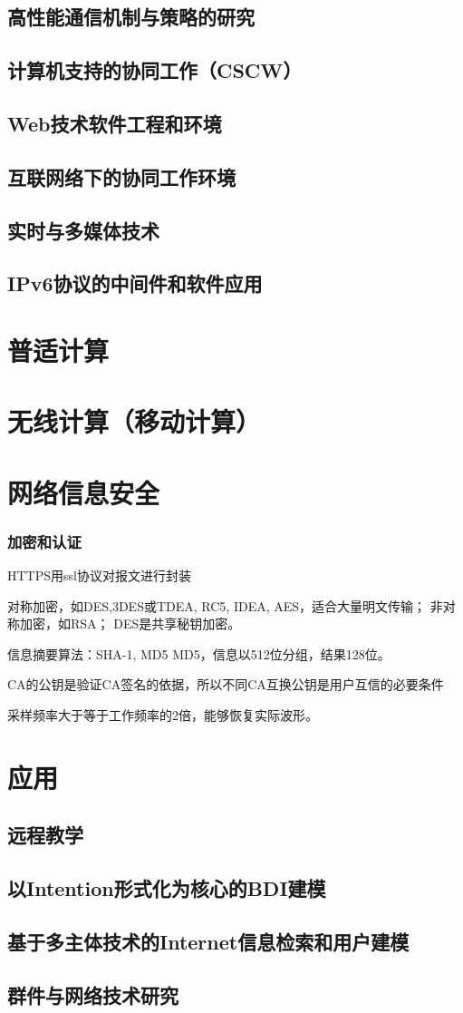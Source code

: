 \documentclass[UTF8]{../computerUniverse}
\begin{document}
\section{高性能通信机制与策略的研究}
\section{计算机支持的协同工作（CSCW）}
\section{Web技术软件工程和环境}
\section{互联网络下的协同工作环境}
\section{实时与多媒体技术}
\section{IPv6协议的中间件和软件应用}


\chapter{普适计算}
\chapter{无线计算（移动计算）}


\chapter{网络信息安全}
\subsection{加密和认证}
HTTPS用ssl协议对报文进行封装

对称加密，如DES,3DES或TDEA, RC5, IDEA, AES，适合大量明文传输；
非对称加密，如RSA；
DES是共享秘钥加密。

信息摘要算法：SHA-1, MD5
MD5，信息以512位分组，结果128位。


CA的公钥是验证CA签名的依据，所以不同CA互换公钥是用户互信的必要条件


采样频率大于等于工作频率的2倍，能够恢复实际波形。




\chapter{应用}
\section{远程教学}
\section{以Intention形式化为核心的BDI建模}
\section{基于多主体技术的Internet信息检索和用户建模}
\section{群件与网络技术研究}
\end{document}
